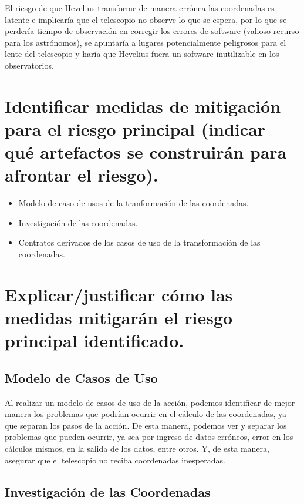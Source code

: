 \documentclass[letterpaper,spanish,10pt]{article}
\begin{document}
El riesgo de que Hevelius transforme de manera err\'onea las coordenadas es latente e implicar\'ia que el telescopio no observe
lo que se espera, por lo que se perder\'ia tiempo de observaci\'on en corregir los errores de software (valioso recurso para los
astr\'onomos), se apuntar\'ia a lugares potencialmente peligrosos para el lente del telescopio y har\'ia que Hevelius fuera un software
inutilizable en los observatorios.



\section{Identificar medidas de mitigaci\'on para el riesgo principal (indicar qu\'e artefactos se construir\'an para afrontar el riesgo).}

\begin{itemize}
	\item Modelo de caso de usos de la tranformaci\'on de las coordenadas.
	\item Investigaci\'on de las coordenadas.
	\item Contratos derivados de los casos de uso de la transformaci\'on de las coordenadas.
\end{itemize}


\section{Explicar/justificar c\'omo las medidas mitigar\'an el riesgo principal identificado.}

\subsection{Modelo de Casos de Uso}

Al realizar un modelo de casos de uso de la acci\'on, podemos identificar de mejor manera los problemas que podr\'ian ocurrir en el c\'alculo de las coordenadas, ya que separan los pasos de la acci\'on. De esta manera, podemos ver y separar los problemas que pueden ocurrir, ya sea por ingreso de datos err\'oneos, error en los c\'alculos mismos, en la salida de los datos, entre otros. Y, de esta manera, asegurar que el telescopio no reciba coordenadas inesperadas.

\subsection{Investigaci\'on de las Coordenadas}
\end{document}
